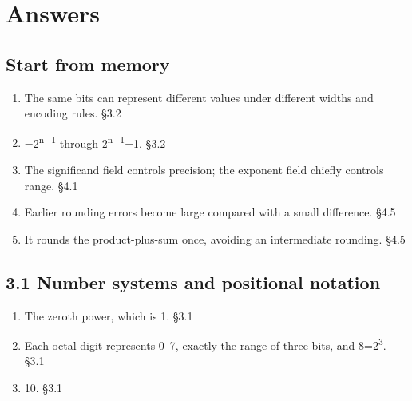 \documentclass[11pt]{article}
\begin{document}
\section{Answers}
\begin{keepsection}\subsection{Start from memory}

\begin{enumerate}
\item The same bits can represent different values under different widths and encoding rules. \hfill{\small\color{FAUblue}§3.2}
\item \ensuremath{-}2\textsuperscript{n\ensuremath{-}1} through 2\textsuperscript{n\ensuremath{-}1}\ensuremath{-}1. \hfill{\small\color{FAUblue}§3.2}
\item The significand field controls precision; the exponent field chiefly controls range. \hfill{\small\color{FAUblue}§4.1}
\item Earlier rounding errors become large compared with a small difference. \hfill{\small\color{FAUblue}§4.5}
\item It rounds the product-plus-sum once, avoiding an intermediate rounding. \hfill{\small\color{FAUblue}§4.5}
\end{enumerate}

\end{keepsection}
\begin{keepsection}\subsection{3.1 Number systems and positional notation}

\begin{enumerate}
\item The zeroth power, which is 1. \hfill{\small\color{FAUblue}§3.1}
\item Each octal digit represents 0–7, exactly the range of three bits, and 8=2\textsuperscript{3}. \hfill{\small\color{FAUblue}§3.1}
\item 10. \hfill{\small\color{FAUblue}§3.1}
\end{enumerate}

\end{keepsection}
\end{document}
